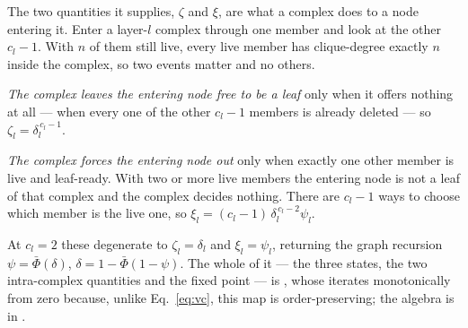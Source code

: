 The two quantities it supplies, $\zeta$ and $\xi$, are what a complex does to a
node entering it. Enter a layer-$l$ complex through one member and look at the
other $c_{l}-1$. With $n$ of them still live, every live member has
clique-degree exactly $n$ inside the complex, so two events matter and no
others.

\emph{The complex leaves the entering node free to be a leaf} only when it
offers nothing at all --- when every one of the other $c_{l}-1$ members is
already deleted --- so $\zeta_{l}=\delta_{l}^{\,c_{l}-1}$.

\emph{The complex forces the entering node out} only when exactly one other
member is live and leaf-ready. With two or more live members the entering node
is not a leaf of that complex and the complex decides nothing. There are
$c_{l}-1$ ways to choose which member is the live one, so
$\xi_{l}=(c_{l}-1)\,\delta_{l}^{\,c_{l}-2}\psi_{l}$.

At $c_{l}=2$ these degenerate to $\zeta_{l}=\delta_{l}$ and $\xi_{l}=\psi_{l}$,
returning the graph recursion $\psi=\bar\Phi(\delta)$, $\delta=1-\bar\Phi(1-\psi)$. The whole of it
--- the three states, the two intra-complex quantities and the fixed point --- is
, whose  iterates monotonically from
zero because, unlike Eq.~\eqref{eq:vc}, this map is order-preserving; the
algebra is in .

